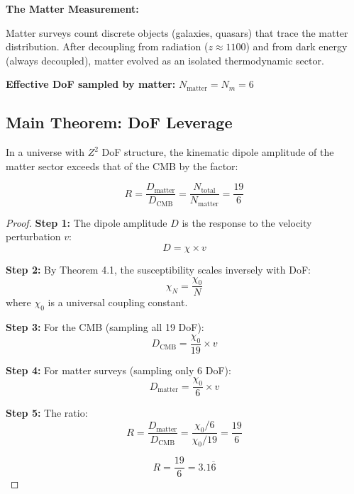 \documentclass[12pt,a4paper]{article}
\begin{document}
\textbf{The Matter Measurement:}

Matter surveys count discrete objects (galaxies, quasars) that trace the matter distribution. After decoupling from radiation ($z \approx 1100$) and from dark energy (always decoupled), matter evolved as an isolated thermodynamic sector.

\textbf{Effective DoF sampled by matter:} $N_{\text{matter}} = N_m = 6$

\subsection{Main Theorem: DoF Leverage}

\begin{theorem}
In a universe with $Z^2$ DoF structure, the kinematic dipole amplitude of the matter sector exceeds that of the CMB by the factor:

\begin{equation}
R = \frac{D_{\text{matter}}}{D_{\text{CMB}}} = \frac{N_{\text{total}}}{N_{\text{matter}}} = \frac{19}{6}
\end{equation}
\end{theorem}

\begin{proof}
\textbf{Step 1:} The dipole amplitude $D$ is the response to the velocity perturbation $v$:
\begin{equation}
D = \chi \times v
\end{equation}

\textbf{Step 2:} By Theorem 4.1, the susceptibility scales inversely with DoF:
\begin{equation}
\chi_N = \frac{\chi_0}{N}
\end{equation}
where $\chi_0$ is a universal coupling constant.

\textbf{Step 3:} For the CMB (sampling all 19 DoF):
\begin{equation}
D_{\text{CMB}} = \frac{\chi_0}{19} \times v
\end{equation}

\textbf{Step 4:} For matter surveys (sampling only 6 DoF):
\begin{equation}
D_{\text{matter}} = \frac{\chi_0}{6} \times v
\end{equation}

\textbf{Step 5:} The ratio:
\begin{equation}
R = \frac{D_{\text{matter}}}{D_{\text{CMB}}} = \frac{\chi_0 / 6}{\chi_0 / 19} = \frac{19}{6}
\end{equation}

\begin{equation}
\boxed{R = \frac{19}{6} = 3.1\overline{6}}
\end{equation}
\end{proof}
\end{document}
